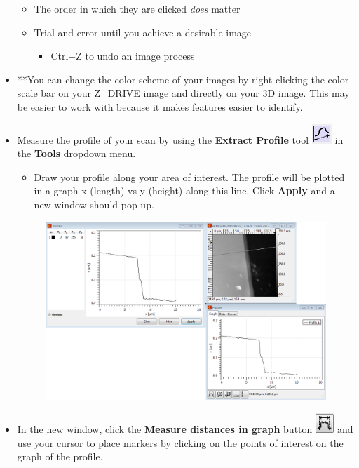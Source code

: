 \documentclass{../lab}
\begin{document}
\begin{itemize}
\begin{itemize}
        \item The order in which they are clicked \emph{does} matter
        
        \item Trial and error until you achieve a desirable image
        \begin{itemize}
            \item Ctrl+Z to undo an image process
        \end{itemize}
        
    \end{itemize}
    
    \item **You can change the color scheme of your images by right-clicking the color scale bar on your Z\_DRIVE image and directly on your 3D image.  This may be easier to work with because it makes features easier to identify.
    
    \item Measure the profile of your scan by using the \textbf{Extract Profile} tool \includegraphics[height=2em]{images/profiles.png} in the \textbf{Tools} dropdown menu.
    \begin{itemize}
        \item Draw your profile along your area of interest.  The profile will be plotted in a graph x (length) vs y (height) along this line. Click \textbf{Apply} and a new window should pop up.
    \end{itemize}
    
    \begin{figure}[H]
        \centering
        \href{http://experimentationlab.berkeley.edu/sites/default/files/AFMImages/49.png}{\includegraphics[width=0.5\linewidth]{images/49.png}}
        \caption{}
    \end{figure}
    
    \item In the new window, click the \textbf{Measure distances in graph} button \includegraphics[height=2em]{images/50.png} and use your cursor to place markers by clicking on the points of interest on the graph of the profile.
    

\end{itemize}
\end{document}
